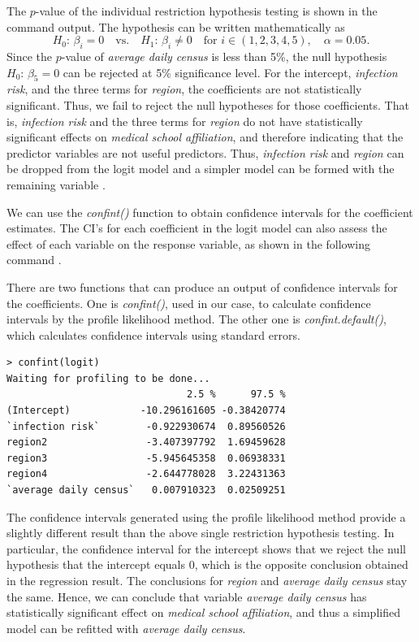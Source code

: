 \documentclass[11pt]{article}
\begin{document}
The $p$-value of the individual restriction hypothesis testing is shown in the command output. The hypothesis can be written mathematically as
\[
\textit{H}_0:\,\beta_{i}=0\quad\textrm{vs.}\quad\textit{H}_1:\,\beta_{i}\neq0 \quad\textrm{for}\,\, i\in(1, 2, 3, 4, 5), \quad \alpha=0.05.
\]
Since the $p$-value of \textit{average daily census} is less than 5\%, the null hypothesis $\textit{H}_0:\,\beta_{5}=0$ can be rejected at 5\% significance level. For the intercept, \textit{infection risk}, and the three terms for \textit{region}, the coefficients are not statistically significant. Thus, we fail to reject the null hypotheses for those coefficients. That is, \textit{infection risk} and the three terms for \textit{region} do not have statistically significant effects on \textit{medical school affiliation}, and therefore indicating that the predictor variables are not useful predictors. Thus, \textit{infection risk} and \textit{region} can be dropped from the logit model and a simpler model can be formed with the remaining variable \cite{bk:tamhane_dunlop}.

We can use the \textit{confint()} function to obtain confidence intervals for the coefficient estimates. The CI's for each coefficient in the logit model can also assess the effect of each variable on the response variable, as shown in the following command \cite{bk:tamhane_dunlop}.

\begin{warn}[Notice:]
There are two functions that can produce an output of confidence intervals for the coefficients. One is \textit{confint()}, used in our case, to calculate confidence intervals by the profile likelihood method. The other one is \textit{confint.default()}, which calculates confidence intervals using standard errors.
\end{warn}

\begin{commandline}
\begin{verbatim}
> confint(logit)
Waiting for profiling to be done...
                               2.5 %      97.5 %
(Intercept)            -10.296161605 -0.38420774
`infection risk`        -0.922930674  0.89560526
region2                 -3.407397792  1.69459628
region3                 -5.945645358  0.06938331
region4                 -2.644778028  3.22431363
`average daily census`   0.007910323  0.02509251
\end{verbatim}
\end{commandline}
The confidence intervals generated using the profile likelihood method provide a slightly different result than the above single restriction hypothesis testing. In particular, the confidence interval for the intercept shows that we reject the null hypothesis that the intercept equals 0, which is the opposite conclusion obtained in the regression result. The conclusions for \textit{region} and \textit{average daily census} stay the same. Hence, we can conclude that variable \textit{average daily census} has statistically significant effect on \textit{medical school affiliation}, and thus a simplified model can be refitted with \textit{average daily census}.
\end{document}
